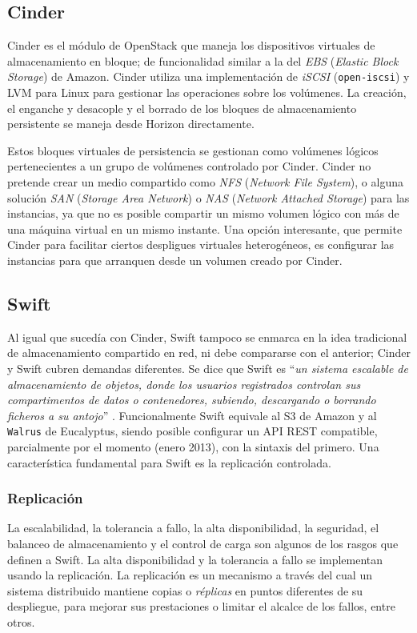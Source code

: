  
\subsection{Cinder}\label{subsec:cinder}
\noindent Cinder es el m\'odulo de OpenStack que maneja los dispositivos virtuales de almacenamiento en bloque; de funcionalidad similar a la del \emph{EBS} (\emph{Elastic Block Storage}) de Amazon. Cinder utiliza una implementaci\'on de \emph{iSCSI} (\texttt{open-iscsi}) y LVM para Linux para gestionar las operaciones sobre los vol\'umenes. La creaci\'on, el enganche y desacople y el borrado de los bloques de almacenamiento persistente se maneja desde Horizon directamente.\newline

Estos bloques virtuales de persistencia se gestionan como vol\'umenes l\'ogicos pertenecientes a un grupo de vol\'umenes controlado por Cinder. Cinder no pretende crear un medio compartido como \emph{NFS} (\emph{Network File System}), o alguna soluci\'on \emph{SAN} (\emph{Storage Area Network}) o \emph{NAS} (\emph{Network Attached Storage}) para las instancias, ya que no es posible compartir un mismo vo\-lu\-men l\'ogico con m\'as de una m\'aquina virtual en un mismo instante. Una opci\'on interesante, que permite Cinder para facilitar ciertos despligues virtuales heterog\'eneos, es configurar las instancias para que arranquen desde un volumen creado por Cinder.


\subsection{Swift}\label{subsec:swift}
\noindent Al igual que suced\'ia con Cinder, Swift tampoco se enmarca en la idea tradicional de almacenamiento compartido en red, ni debe compararse con el anterior; Cinder y Swift cubren demandas diferentes. Se dice que Swift es ``\textit{un sistema escalable de almacenamiento de objetos, donde los usuarios registrados controlan sus compartimentos de datos o contenedores, subiendo, descargando o borrando ficheros a su antojo}'' \cite{osswift}. Funcionalmente Swift equivale al S3 de Amazon y al \texttt{Walrus} de Eucalyptus, siendo posible con\-fi\-gu\-rar un API REST compatible, parcialmente por el momento (enero 2013), con la sintaxis del primero. Una caracter\'istica fundamental para Swift es la replicaci\'on controlada.


\subsubsection{Replicaci\'on}\label{subsubsec:replicacion}
\noindent La escalabilidad, la tolerancia a fallo, la alta disponibilidad, la seguridad, el balanceo de almacenamiento y el control de carga son algunos de los rasgos que definen a Swift. La alta disponibilidad y la tolerancia a fallo se implementan usando la replicaci\'on. La replicaci\'on es un mecanismo a trav\'es del cual un sistema distribuido mantiene copias o \emph{r\'eplicas} en puntos diferentes de su despliegue, para mejorar sus prestaciones o limitar el alcalce de los fallos, entre otros.\newline

